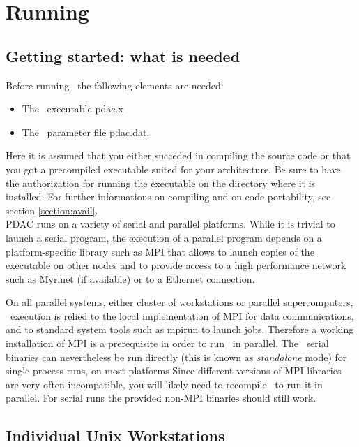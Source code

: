 \section{Running \PDAC}
\label{section:run}

\subsection{Getting started: what is needed}

Before running \PDAC\ the following elements are needed:
\begin{itemize}
\item The \PDAC\ executable pdac.x
\item The \PDAC\ parameter file pdac.dat.
\end{itemize}

Here it is assumed that you either succeded in compiling the source
code or that you got a precompiled executable suited for your architecture.
Be sure to have the authorization for running the executable on the
directory where it is installed. For further informations on compiling and 
on code portability, see section \ref{section:avail}.\\

PDAC runs on a variety of serial and parallel platforms.  While it is
trivial to launch a serial program, the execution of a parallel program 
depends on a platform-specific library such as MPI that allows to launch 
copies of the executable on other nodes and to provide access to a high 
performance network such as Myrinet (if available) or to a Ethernet connection.

On all parallel systems, either cluster of workstations or parallel 
supercomputers, \PDAC\ execution is relied to the local implementation
of MPI for data communications, and to standard system tools such as
mpirun to launch jobs. Therefore a working installation of MPI is a 
prerequisite in order to run \PDAC\ in parallel.
The \PDAC\ serial binaries can nevertheless be run directly (this is known 
as {\it standalone} mode) for single process runs, on most platforms
Since different versions of MPI libraries are very often incompatible, you will 
likely need to recompile \PDAC\ to run it in parallel. For serial runs
the provided non-MPI binaries should still work.

\subsection{Individual Unix Workstations}

